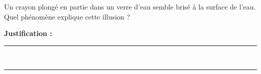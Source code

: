 Un crayon plongé en partie dans un verre d'eau semble brisé à la surface de l'eau. Quel phénomène explique cette illusion ?

\choices

\noindent\textbf{Justification :} \hrulefill \\[2.5ex]
\rule{\linewidth}{0.4pt} \\[2.5ex]
\rule{\linewidth}{0.4pt}
\vfill
